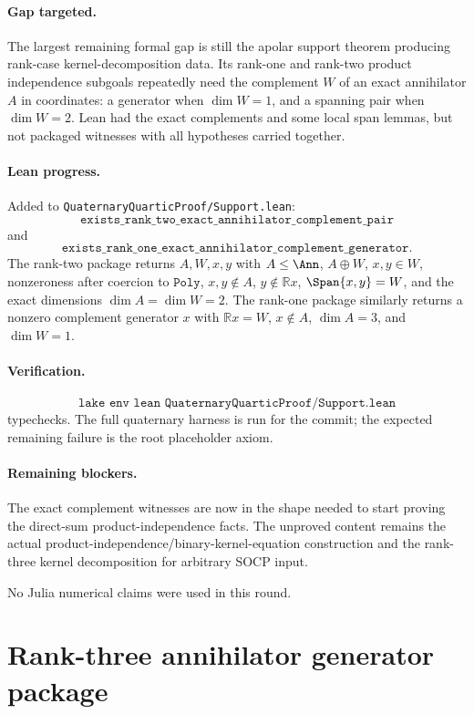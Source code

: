 \documentclass[11pt]{article}
\begin{document}
\paragraph{Gap targeted.}
The largest remaining formal gap is still the apolar support theorem producing
rank-case kernel-decomposition data.  Its rank-one and rank-two product
independence subgoals repeatedly need the complement \(W\) of an exact
annihilator \(A\) in coordinates: a generator when \(\dim W=1\), and a spanning
pair when \(\dim W=2\).  Lean had the exact complements and some local span
lemmas, but not packaged witnesses with all hypotheses carried together.

\paragraph{Lean progress.}
Added to \texttt{QuaternaryQuarticProof/Support.lean}:
\[
\texttt{exists\_rank\_two\_exact\_annihilator\_complement\_pair}
\]
and
\[
\texttt{exists\_rank\_one\_exact\_annihilator\_complement\_generator}.
\]
The rank-two package returns \(A,W,x,y\) with \(A\le\Ann\), \(A\oplus W\),
\(x,y\in W\), nonzeroness after coercion to \(\texttt{Poly}\), \(x,y\notin A\),
\(y\notin\mathbb R x\), \(\Span\{x,y\}=W\), and the exact dimensions
\(\dim A=\dim W=2\).  The rank-one package similarly returns a nonzero
complement generator \(x\) with \(\mathbb R x=W\), \(x\notin A\),
\(\dim A=3\), and \(\dim W=1\).

\paragraph{Verification.}
\[
\texttt{lake env lean QuaternaryQuarticProof/Support.lean}
\]
typechecks.  The full quaternary harness is run for the commit; the expected
remaining failure is the root placeholder axiom.

\paragraph{Remaining blockers.}
The exact complement witnesses are now in the shape needed to start proving
the direct-sum product-independence facts.  The unproved content remains the
actual product-independence/binary-kernel-equation construction and the
rank-three kernel decomposition for arbitrary SOCP input.

No Julia numerical claims were used in this round.

\section*{Rank-three annihilator generator package}
\end{document}
